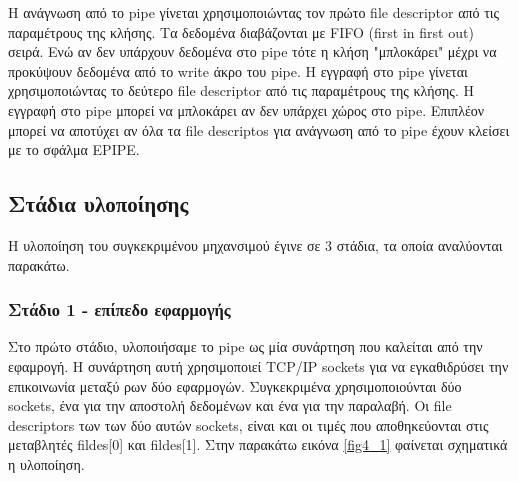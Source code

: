 Η ανάγνωση από το pipe γίνεται χρησιμοποιώντας τον πρώτο file descriptor από τις
παραμέτρους της κλήσης. Τα δεδομένα διαβάζονται με FIFO (first in first out)
σειρά. Ενώ αν δεν υπάρχουν δεδομένα στο pipe τότε η κλήση "μπλοκάρει" μέχρι να
προκύψουν δεδομένα από το write άκρο του pipe. Η εγγραφή στο pipe γίνεται
χρησιμοποιώντας το δεύτερο file descriptor από τις παραμέτρους της κλήσης. Η
εγγραφή στο pipe μπορεί να μπλοκάρει αν δεν υπάρχει χώρος στο pipe. Επιπλέον
μπορεί να αποτύχει αν όλα τα file descriptos για ανάγνωση από το pipe έχουν
κλείσει με το σφάλμα EPIPE. 

\subsection{Στάδια υλοποίησης}

Η υλοποίηση του συγκεκριμένου μηχανσιμού έγινε σε 3 στάδια, τα οποία αναλύονται
παρακάτω. 

\subsubsection{Στάδιο 1 - επίπεδο εφαρμογής}


Στο πρώτο στάδιο, υλοποιήσαμε το pipe ως μία συνάρτηση που καλείται από την
εφαμρογή. Η συνάρτηση αυτή χρησιμοποιεί TCP/IP sockets για να εγκαθιδρύσει την
επικοινωνία μεταξύ ρων δύο εφαρμογών. Συγκεκριμένα χρησιμοποιούνται δύο sockets,
ένα για την αποστολή δεδομένων και ένα για την παραλαβή. Οι file descriptors των
των δύο αυτών sockets, είναι και οι τιμές που αποθηκεύονται στις μεταβλητές
fildes[0] και fildes[1]. Στην παρακάτω εικόνα \ref{fig4_1} φαίνεται σχηματικά η
υλοποίηση.

